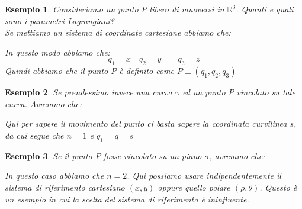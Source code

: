 \documentclass[11pt,a4paper,twoside]{article}
\newtheorem{es}{Esempio}
\theoremstyle{definition}
\begin{document}
\begin{es}
	Consideriamo un punto $P$ libero di muoversi in $\mathbb R^3$. Quanti e quali sono i parametri Lagrangiani?\\
	Se mettiamo un sistema di coordinate cartesiane abbiamo che:
	\begin{center}
	\end{center}
	In questo modo abbiamo che:
	\[ q_1 = x\quad q_2 = y \qquad q_3 = z \]
	Quindi abbiamo che il punto $P$ è definito come $P \equiv (q_1,q_2,q_3)$
\end{es}

\begin{es}
	Se prendessimo invece una curva $\gamma$ ed un punto $P$ vincolato su tale curva. Avremmo che:
	\begin{center}
	\end{center}
	Qui per sapere il movimento del punto ci basta sapere la coordinata curvilinea $s$, da cui segue che $n = 1$ e $q_1 = q = s$
\end{es}

\begin{es}
	Se il punto $P$ fosse vincolato su un piano $\sigma$, avremmo che:
	\begin{center}
	\end{center}
	In questo caso abbiamo che $n=2$. Qui possiamo usare indipendentemente il sistema di riferimento cartesiano $(x,y)$ oppure quello polare $(\rho, \theta)$. Questo è un esempio in cui la scelta del sistema di riferimento è ininfluente.
\end{es}
\end{document}
